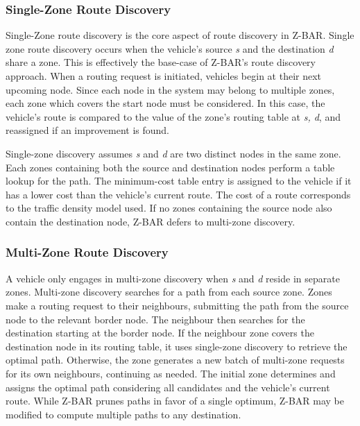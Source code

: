 \documentclass[conference]{IEEEtran}
\begin{document}
\subsubsection{Single-Zone Route Discovery}

Single-Zone route discovery is the core aspect of route discovery in Z-BAR. Single zone route discovery occurs when the vehicle's source \textit{s} and the destination \textit{d} share a zone. This is effectively the base-case of Z-BAR's route discovery approach. When a routing request is initiated, vehicles begin at their next upcoming node. Since each node in the system may belong to multiple zones, each zone which covers the start node must be considered. In this case, the vehicle's route is compared to the value of the zone's routing table at \textit{s, d}, and reassigned if an improvement is found.


Single-zone discovery assumes \textit{s} and \textit{d} are two distinct nodes in the same zone. Each zones containing both the source and destination nodes perform a table lookup for the path. The minimum-cost table entry is assigned to the vehicle if it has a lower cost than the vehicle's current route. The cost of a route corresponds to the traffic density model used. If no zones containing the source node also contain the destination node, Z-BAR defers to multi-zone discovery.

\subsubsection{Multi-Zone Route Discovery}

A vehicle only engages in multi-zone discovery when \textit{s} and \textit{d} reside in separate zones. Multi-zone discovery searches for a path from each source zone. Zones make a routing request to their neighbours, submitting the path from the source node to the relevant border node. The neighbour then searches for the destination starting at the border node. If the neighbour zone covers the destination node in its routing table, it uses single-zone discovery to retrieve the optimal path. Otherwise, the zone generates a new batch of multi-zone requests for its own neighbours, continuing as needed. The initial zone determines and assigns the optimal path considering all candidates and the vehicle's current route. While Z-BAR prunes paths in favor of a single optimum, Z-BAR may be modified to compute multiple paths to any destination.
\end{document}
